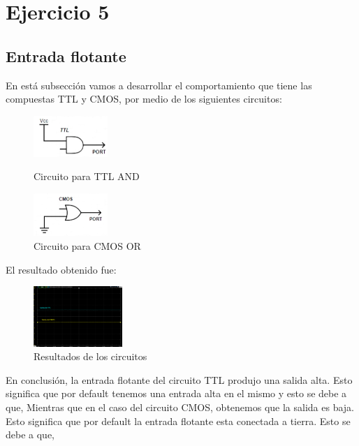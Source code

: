 \section{Ejercicio 5}

\subsection{Entrada flotante}
En está subsección vamos a desarrollar el comportamiento que tiene las compuestas TTL y CMOS, por medio de los siguientes circuitos:

\begin{figure}[H]
	\centering
	\begin{minipage}{0.4\textwidth}
    		\centering
		\includegraphics[width=0.25\textwidth]{Ejercicio5/TTL.png}
		\caption{Circuito para TTL AND}
	\end{minipage}
	\hspace{5mm}
	\begin{minipage}{0.4\textwidth}
		\centering
		\includegraphics[width=0.25\textwidth]{Ejercicio5/CMOS.png}
		\caption{Circuito para CMOS OR}
	\end{minipage}
\end{figure}
El resultado obtenido fue:
\begin{figure}[H]
	\centering
	\includegraphics[width=0.3\textwidth]{Ejercicio5/Flotante.png}
	\caption{Resultados de los circuitos}
\end{figure}

En conclusión, la entrada flotante del circuito TTL produjo una salida alta. Esto significa que por default tenemos una entrada alta en el mismo y esto se debe a que, %
Mientras que en el caso del circuito CMOS, obtenemos que la salida es baja. Esto significa que por default la entrada flotante esta conectada a tierra. Esto se debe a que, %

